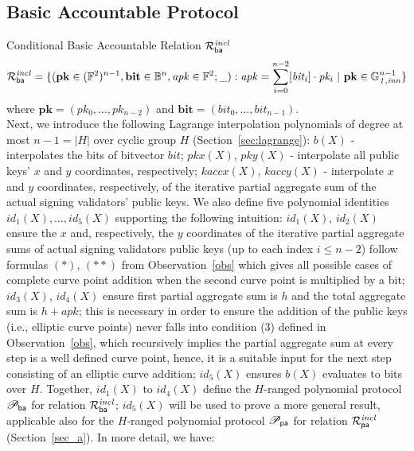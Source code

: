 \subsection{Basic Accountable Protocol}
\label{sec_la}
\noindent \textsf{Conditional Basic Accountable Relation $\mathcal{R}^{\mathit{incl}}_{\mathsf{ba}}$}  
\vspace{-0.055in}
\begin{equation*}
\begin{split}
\mathcal{R}^{\mathit{incl}}_{\mathsf{ba}} =  \{(\mathbf{pk} \in ({\mathbb{F}^2})^{n-1}, \mathbf{bit} \in \mathbb{B}^n,
\mathit{apk} \in \mathbb{F}^2; \_) : \mathit{apk} = \sum_{i=0}^{n-2} [\mathit{bit_i}] \cdot \mathit{pk_i} \ | \ \mathbf{pk} \in \mathbb{G}_{\mathit{1,inn}}^{n-1} \} 
\end{split}
\end{equation*}
\vspace{-0.008in}
\noindent where $\mathbf{pk} = (\mathit{pk_0}, \ldots, \mathit{pk_{n-2}})$ and $\mathbf{bit} = (\mathit{bit_0}, \ldots, \mathit{bit_{n-1}})$.\\ 

\noindent Next, we introduce the following Lagrange interpolation polynomials of degree at most $n-1 = |H|$ over cyclic group $H$ (Section~\ref{sec:lagrange}): 
$b(X)$ - interpolates the bits of bitvector $\mathit{bit}$; $pkx(X)$, $pky(X)$ - interpolate all public keys' 
$x$ and $y$ coordinates, respectively; $kaccx(X)$, $kaccy(X)$ - interpolate $x$ and $y$ coordinates, respectively, 
of the iterative partial aggregate sum of the actual signing validators' public keys. We also define five polynomial identities $id_1(X), \ldots, id_5(X)$ supporting the following intuition: $id_1(X)$, $id_2(X)$ 
ensure the $x$ and, respectively, the $y$ coordinates of the iterative partial aggregate sums of actual signing validators public keys (up to each index $i \leq n-2$) 
follow formulas $(\ast)$, $(\ast\ast)$ from Observation~\ref{obs} which gives all possible cases of 
complete curve point addition when the second curve point is multiplied by a bit; $id_3(X)$, $id_4(X)$ 
ensure first partial aggregate sum is $h$ and the total aggregate sum is $h + \mathit{apk}$; this is necessary in order to ensure the addition of the public keys (i.e., elliptic curve points) 
never falls into condition (3) defined in Observation~\ref{obs}, which recursively implies the partial aggregate sum at every step is a well defined curve point, hence, it is a suitable input for the next step consisting of an elliptic curve addition; 
$id_5(X)$ ensures $b(X)$ evaluates to bits over $H$. Together, $id_1(X)$ to $id_4(X)$ define 
the $H$-ranged polynomial protocol $\mathscr{P}_{\mathsf{ba}}$ for relation $\mathcal{R}^{\mathit{incl}}_{\mathsf{ba}}$; $id_5(X)$ will be used to prove a more general result, applicable also for the 
$H$-ranged polynomial protocol $\mathscr{P}_{\mathsf{pa}}$ for relation $\mathcal{R}^{\mathit{incl}}_{\mathsf{pa}}$ (Section~\ref{sec_a}). In more detail, we have:  \\

